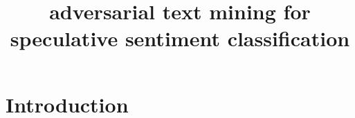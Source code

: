 \documentclass[3p,review]{elsarticle}
\begin{document}
\begin{frontmatter}

\title{adversarial text mining for speculative sentiment classification }








\begin{abstract}

\end{abstract}

\begin{keyword}
\end{keyword}

\end{frontmatter}

\linenumbers

\section{Introduction}

\end{document}
